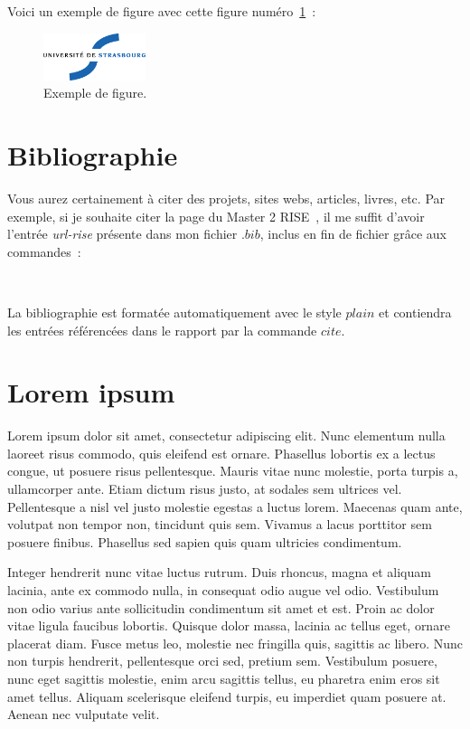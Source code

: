 \documentclass[twoside,openright,a4paper,11pt,french]{article}
\begin{document}
Voici un exemple de figure avec cette figure numéro~\ref{fig:uds}~:

\begin{figure}[ht]
\centering
  \includegraphics[width=3cm,angle=45]{pics/uds.eps}
  \caption{Exemple de figure.}
  \label{fig:uds}
\end{figure}

\section{Bibliographie}

Vous aurez certainement à citer des projets, sites webs, articles, livres, etc.
Par exemple, si je souhaite citer la page du Master 2 RISE~\cite{url-rise}, il me suffit d'avoir l'entrée {\it url-rise} présente dans mon fichier $.bib$, inclus en fin de fichier  grâce aux commandes~:
\begin{verbatim}


\end{verbatim} 

La bibliographie est formatée automatiquement avec le style $plain$ et contiendra les entrées référencées dans le rapport par la commande $cite$.

\section{Lorem ipsum}

Lorem ipsum dolor sit amet, consectetur adipiscing elit. Nunc elementum nulla laoreet risus commodo, quis eleifend est ornare. Phasellus lobortis ex a lectus congue, ut posuere risus pellentesque. Mauris vitae nunc molestie, porta turpis a, ullamcorper ante. Etiam dictum risus justo, at sodales sem ultrices vel. Pellentesque a nisl vel justo molestie egestas a luctus lorem. Maecenas quam ante, volutpat non tempor non, tincidunt quis sem. Vivamus a lacus porttitor sem posuere finibus. Phasellus sed sapien quis quam ultricies condimentum.

Integer hendrerit nunc vitae luctus rutrum. Duis rhoncus, magna et aliquam lacinia, ante ex commodo nulla, in consequat odio augue vel odio. Vestibulum non odio varius ante sollicitudin condimentum sit amet et est. Proin ac dolor vitae ligula faucibus lobortis. Quisque dolor massa, lacinia ac tellus eget, ornare placerat diam. Fusce metus leo, molestie nec fringilla quis, sagittis ac libero. Nunc non turpis hendrerit, pellentesque orci sed, pretium sem. Vestibulum posuere, nunc eget sagittis molestie, enim arcu sagittis tellus, eu pharetra enim eros sit amet tellus. Aliquam scelerisque eleifend turpis, eu imperdiet quam posuere at. Aenean nec vulputate velit.
\end{document}
